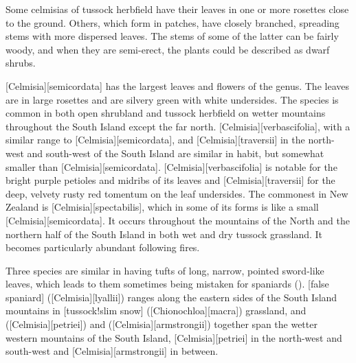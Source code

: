 Some celmisias of tussock herbfield have their leaves in one or more rosettes close to the ground.
Others, which form in patches, have closely branched, spreading stems with more dispersed leaves.
The stems of some of the latter can be fairly woody, and when they are semi-erect, the plants could be described as dwarf shrubs.

[Celmisia][semicordata] has the largest leaves and flowers of the genus.
The leaves are in large rosettes and are silvery green with white undersides.
The species is common in both open shrubland and tussock herbfield on wetter mountains throughout the South Island except the far north. [Celmisia][verbascifolia], with a similar range to [Celmisia][semicordata], and [Celmisia][traversii]  in the north-west and south-west of the South Island are similar in habit, but somewhat smaller than [Celmisia][semicordata]. [Celmisia][verbascifolia] is notable for the bright purple petioles and midribs of its leaves and [Celmisia][traversii] for the deep, velvety rusty red tomentum on the leaf undersides.
The commonest  in New Zealand is [Celmisia][spectabilis], which in some of its forms is like a small [Celmisia][semicordata].
It occurs throughout the mountains of the North and the northern half of the South Island in both wet and dry tussock grassland.
It becomes particularly abundant following fires.

Three species are similar in having tufts of long, narrow, pointed sword-like leaves, which leads to them sometimes being mistaken for spaniards (). [false spaniard] ([Celmisia][lyallii]) ranges along the eastern sides of the South Island mountains in [tussock!slim snow] ([Chionochloa][macra]) grassland, and  ([Celmisia][petriei]) and  ([Celmisia][armstrongii]) together span the wetter western mountains of the South Island, [Celmisia][petriei] in the north-west and south-west and [Celmisia][armstrongii] in between.

